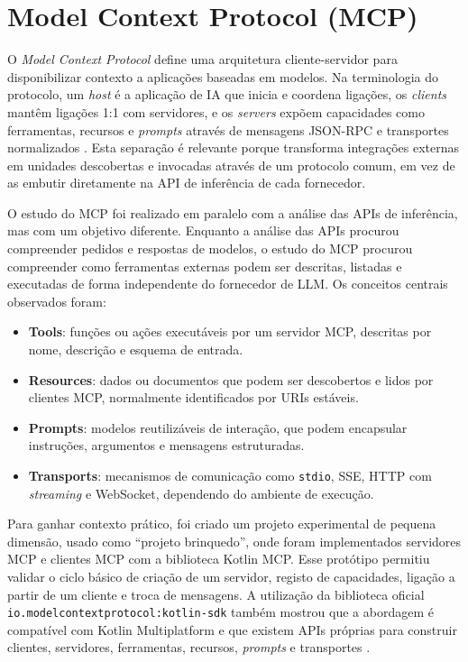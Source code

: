 \documentclass[11pt,a4paper]{report}
\begin{document}
    \section{Model Context Protocol (MCP)}
    O \textit{Model Context Protocol} define uma arquitetura cliente-servidor para disponibilizar contexto a aplicações baseadas em modelos. Na terminologia do protocolo, um \textit{host} é a aplicação de IA que inicia e coordena ligações, os \textit{clients} mantêm ligações 1:1 com servidores, e os \textit{servers} expõem capacidades como ferramentas, recursos e \textit{prompts} através de mensagens JSON-RPC e transportes normalizados \cite{mcp_protocol,mcp_architecture}. Esta separação é relevante porque transforma integrações externas em unidades descobertas e invocadas através de um protocolo comum, em vez de as embutir diretamente na API de inferência de cada fornecedor.

    O estudo do MCP foi realizado em paralelo com a análise das APIs de inferência, mas com um objetivo diferente. Enquanto a análise das APIs procurou compreender pedidos e respostas de modelos, o estudo do MCP procurou compreender como ferramentas externas podem ser descritas, listadas e executadas de forma independente do fornecedor de LLM. Os conceitos centrais observados foram:

    \begin{itemize}
        \item \textbf{Tools}: funções ou ações executáveis por um servidor MCP, descritas por nome, descrição e esquema de entrada.
        \item \textbf{Resources}: dados ou documentos que podem ser descobertos e lidos por clientes MCP, normalmente identificados por URIs estáveis.
        \item \textbf{Prompts}: modelos reutilizáveis de interação, que podem encapsular instruções, argumentos e mensagens estruturadas.
        \item \textbf{Transports}: mecanismos de comunicação como \texttt{stdio}, SSE, HTTP com \textit{streaming} e WebSocket, dependendo do ambiente de execução.
    \end{itemize}

    Para ganhar contexto prático, foi criado um projeto experimental de pequena dimensão, usado como ``projeto brinquedo'', onde foram implementados servidores MCP e clientes MCP com a biblioteca Kotlin MCP. Esse protótipo permitiu validar o ciclo básico de criação de um servidor, registo de capacidades, ligação a partir de um cliente e troca de mensagens. A utilização da biblioteca oficial \texttt{io.modelcontextprotocol:kotlin-sdk} também mostrou que a abordagem é compatível com Kotlin Multiplatform e que existem APIs próprias para construir clientes, servidores, ferramentas, recursos, \textit{prompts} e transportes \cite{mcp_kotlin_sdk}.
\end{document}
